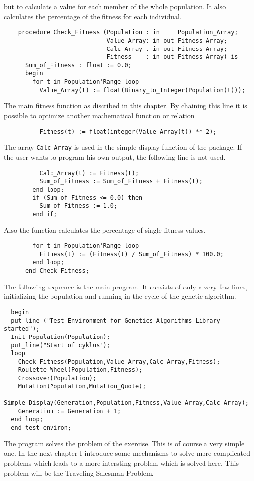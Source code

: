 but to calculate a value for each member of the whole population. It also calculates
the percentage of the fitness for each individual.
\begin{verbatim}
    procedure Check_Fitness (Population : in     Population_Array;
                             Value_Array: in out Fitness_Array;
                             Calc_Array : in out Fitness_Array;
                             Fitness    : in out Fitness_Array) is
      Sum_of_Fitness : float := 0.0;
      begin
        for t in Population'Range loop
          Value_Array(t) := float(Binary_to_Integer(Population(t)));
\end{verbatim}
{\footnotesize The main fitness function as discribed in this chapter. By chaining
this line it is possible to optimize another mathematical function or relation}
\begin{verbatim}
          Fitness(t) := float(integer(Value_Array(t)) ** 2);
\end{verbatim}
{\footnotesize The array {\tt Calc\_Array} is used in the simple display function
of the package. If the user wants to program his own output, the following line
is not used.}
\begin{verbatim}
          Calc_Array(t) := Fitness(t);
          Sum_of_Fitness := Sum_of_Fitness + Fitness(t);
        end loop;
        if (Sum_of_Fitness <= 0.0) then
          Sum_of_Fitness := 1.0;
        end if;
\end{verbatim}
{\footnotesize Also the function calculates the percentage of single fitness
values.}
\begin{verbatim}
        for t in Population'Range loop
          Fitness(t) := (Fitness(t) / Sum_of_Fitness) * 100.0;
        end loop;
      end Check_Fitness;
\end{verbatim}
The following sequence is the main program. It consists of only a very few lines,
initializing the population and running in the cycle of the genetic algorithm.
\begin{verbatim}
  begin
  put_line ("Test Environment for Genetics Algorithms Library started");
  Init_Population(Population);
  put_line("Start of cyklus"); 
  loop
    Check_Fitness(Population,Value_Array,Calc_Array,Fitness);
    Roulette_Wheel(Population,Fitness);
    Crossover(Population);
    Mutation(Population,Mutation_Quote);
    Simple_Display(Generation,Population,Fitness,Value_Array,Calc_Array);
    Generation := Generation + 1;
  end loop;
  end test_environ;
\end{verbatim}
The program solves the problem of the exercise. This is of course a very simple
one. In the next chapter I introduce some mechanisms to solve more complicated
problems which leads to a more intersting problem which is solved here. This
problem will be the {\sc Traveling Salesman Problem}.
